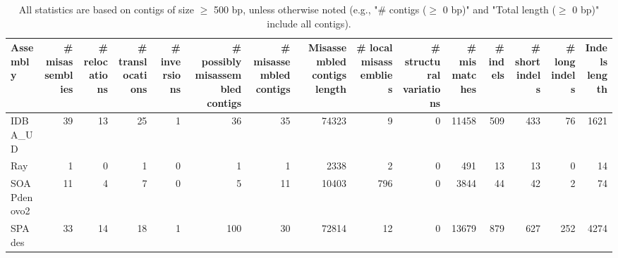 \documentclass[12pt,a4paper]{article}
\begin{document}
\begin{table}[ht]
\begin{center}
\caption{All statistics are based on contigs of size $\geq$ 500 bp, unless otherwise noted (e.g., "\# contigs ($\geq$ 0 bp)" and "Total length ($\geq$ 0 bp)" include all contigs).}
\begin{tabular}{|l*{14}{|r}|}
\hline
Assembly & \# misassemblies &     \# relocations &     \# translocations &     \# inversions & \# possibly misassembled contigs & \# misassembled contigs & Misassembled contigs length & \# local misassemblies & \# structural variations & \# mismatches & \# indels &     \# short indels &     \# long indels & Indels length \\ \hline
IDBA\_UD & 39 & 13 & 25 & 1 & 36 & 35 & 74323 & 9 & 0 & 11458 & 509 & 433 & 76 & 1621 \\ \hline
Ray & 1 & 0 & 1 & 0 & 1 & 1 & 2338 & 2 & 0 & 491 & 13 & 13 & 0 & 14 \\ \hline
SOAPdenovo2 & 11 & 4 & 7 & 0 & 5 & 11 & 10403 & 796 & 0 & 3844 & 44 & 42 & 2 & 74 \\ \hline
SPAdes & 33 & 14 & 18 & 1 & 100 & 30 & 72814 & 12 & 0 & 13679 & 879 & 627 & 252 & 4274 \\ \hline
\end{tabular}
\end{center}
\end{table}
\end{document}
